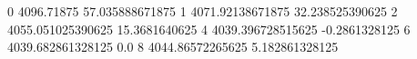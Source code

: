 0 4096.71875 57.035888671875
1 4071.92138671875 32.238525390625
2 4055.051025390625 15.3681640625
4 4039.396728515625 -0.2861328125
6 4039.682861328125 0.0
8 4044.86572265625 5.182861328125
